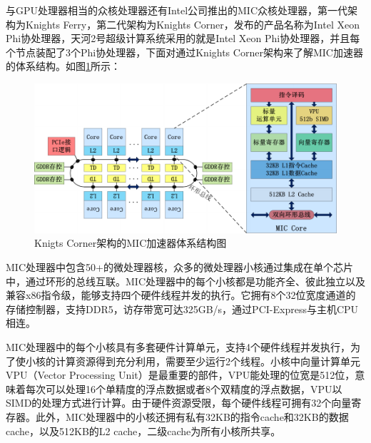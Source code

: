        与GPU处理器相当的众核处理器还有Intel公司推出的MIC众核处理器，第一代架构为Knights Ferry，第二代架构为Knights Corner，发布的产品名称为Intel Xeon Phi协处理器，天河2号超级计算系统采用的就是Intel Xeon Phi协处理器，并且每个节点装配了3个Phi协处理器，下面对通过Knights Corner架构来了解MIC加速器的体系结构。如图\ref{fig:knc_arch}所示：
           \begin{figure}[ht!]
	\centering
	\includegraphics[width=0.9\linewidth]{figs/KNC_arch}
	\caption{Knigts Corner架构的MIC加速器体系结构图}
	\label{fig:knc_arch}
	\end{figure}

       MIC处理器中包含50+的微处理器核，众多的微处理器小核通过集成在单个芯片中，通过环形的总线互联。MIC处理器中的每个小核都是功能齐全、彼此独立以及兼容x86指令级，能够支持四个硬件线程并发的执行。它拥有8个32位宽度通道的存储控制器，支持DDR5，访存带宽可达325GB/s，通过PCI-Express与主机CPU相连。
       
       MIC处理器中的每个小核具有多套硬件计算单元，支持4个硬件线程并发执行，为了使小核的计算资源得到充分利用，需要至少运行2个线程。小核中向量计算单元VPU（Vector Processing Unit）是最重要的部件，VPU能处理的位宽是512位，意味着每次可以处理16个单精度的浮点数据或者8个双精度的浮点数据，VPU以SIMD的处理方式进行计算。由于硬件资源受限，每个硬件线程可拥有32个向量寄存器。此外，MIC处理器中的小核还拥有私有32KB的指令cache和32KB的数据cache，以及512KB的L2 cache，二级cache为所有小核所共享。
       
